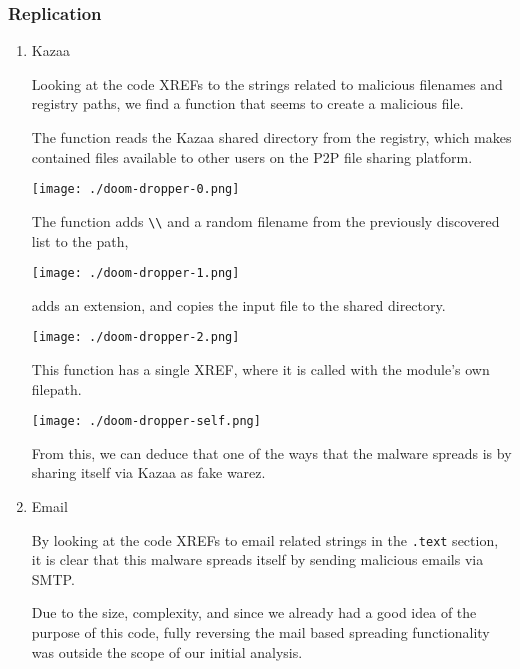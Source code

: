 \documentclass[11pt]{article}
\begin{document}
\subsubsection{Replication}
\label{sec:org2b60da5}
\begin{enumerate}
\item Kazaa
\label{sec:org8ae022e}

Looking at the code XREFs to the strings related to malicious
filenames and registry paths, we find a function that seems to create
a malicious file.

The function reads the Kazaa shared directory from the registry, which
makes contained files available to other users on the P2P file sharing
platform.

\begin{center}
\texttt{[image: ./doom-dropper-0.png]}
\end{center}

The function adds \texttt{\textbackslash{}\textbackslash{}} and a random filename from the previously
discovered list to the path,

\begin{center}
\texttt{[image: ./doom-dropper-1.png]}
\end{center}

adds an extension, and copies the input file to the shared directory.

\begin{center}
\texttt{[image: ./doom-dropper-2.png]}
\end{center}

This function has a single XREF, where it is called with the module's
own filepath.

\begin{center}
\texttt{[image: ./doom-dropper-self.png]}
\end{center}

From this, we can deduce that one of the ways that the malware spreads
is by sharing itself via Kazaa as fake warez.
\item Email
\label{sec:orge1b0a2f}

By looking at the code XREFs to email related strings in the \texttt{.text}
section, it is clear that this malware spreads itself by sending
malicious emails via SMTP.

Due to the size, complexity, and since we already had a good idea of
the purpose of this code, fully reversing the mail based spreading
functionality was outside the scope of our initial analysis.
\end{enumerate}
\end{document}
